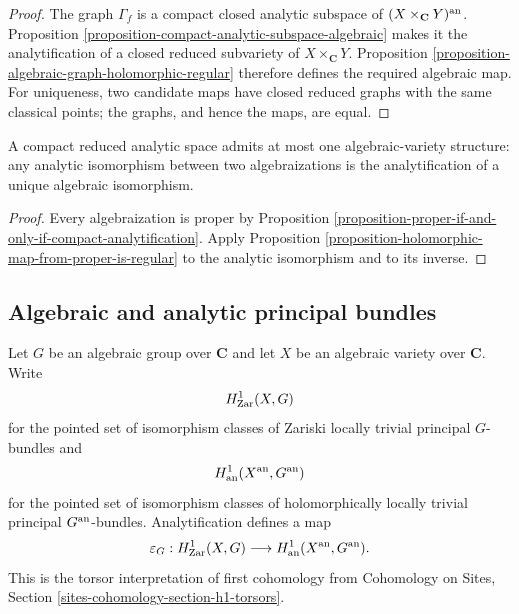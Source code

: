 \begin{proof}
The graph $\Gamma_f$ is a compact closed analytic subspace of
$(X\times_{\mathbf C}Y)^{\rm an}$. Proposition
\ref{proposition-compact-analytic-subspace-algebraic} makes it the
analytification of a closed reduced subvariety of $X\times_{\mathbf C}Y$.
Proposition \ref{proposition-algebraic-graph-holomorphic-regular} therefore
defines the required algebraic map. For uniqueness, two candidate
maps have closed reduced graphs with the same classical points; the graphs,
and hence the maps, are equal.
\end{proof}

\begin{proposition}[Corollary]
\label{corollary-compact-analytic-space-unique-algebraization}
\begin{reference}
\cite[\S 4, no. 19, corollary to Proposition 15]{GAGA}
\end{reference}
A compact reduced analytic space admits at most one algebraic-variety
structure: any analytic isomorphism between two algebraizations is the
analytification of a unique algebraic isomorphism.
\end{proposition}

\begin{proof}
Every algebraization is proper by Proposition
\ref{proposition-proper-if-and-only-if-compact-analytification}. Apply
Proposition \ref{proposition-holomorphic-map-from-proper-is-regular} to the
analytic isomorphism and to its inverse.
\end{proof}


\subsection{Algebraic and analytic principal bundles}
\label{subsection-gaga-principal-bundles}

\begin{definition}
\label{definition-principal-bundle-analytification-map}
\begin{reference}
\cite[\S 4, no. 20]{GAGA}
\end{reference}
Let $G$ be an algebraic group over $\mathbf C$ and let $X$ be an algebraic
variety over $\mathbf C$. Write
$$
H^1_{\rm Zar}(X,G)
$$
for the pointed set of isomorphism classes of Zariski locally trivial
principal $G$-bundles and
$$
H^1_{\rm an}(X^{\rm an},G^{\rm an})
$$
for the pointed set of isomorphism classes of holomorphically locally
trivial principal $G^{\rm an}$-bundles. Analytification defines a map
$$
\varepsilon_G:H^1_{\rm Zar}(X,G)
\longrightarrow H^1_{\rm an}(X^{\rm an},G^{\rm an}).
$$
This is the torsor interpretation of first cohomology from Cohomology on
Sites, Section \ref{sites-cohomology-section-h1-torsors}.
\end{definition}

